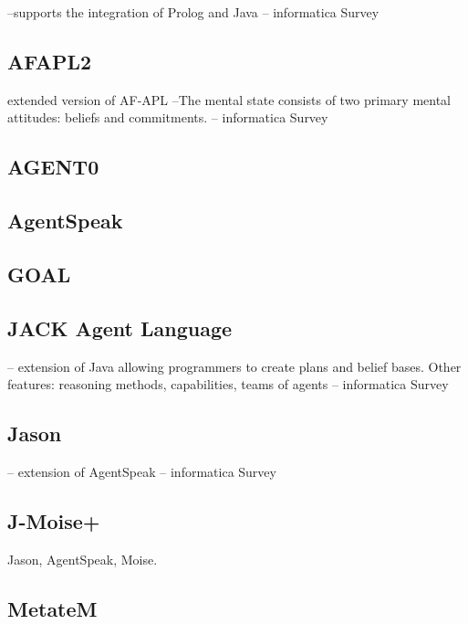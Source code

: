 \documentclass{article}
\begin{document}
--supports the integration of Prolog and Java -- informatica Survey

\subsection{AFAPL2}

extended version of AF-APL \cite{conf/promas/RossCO04}
--The mental state consists of two primary mental attitudes: beliefs and 
commitments. -- informatica Survey

\subsection{AGENT0}

\cite{journals/ai/Shoham93}

\subsection{AgentSpeak}

\cite{conf/maamaw/Rao96}

\subsection{GOAL}

\cite{hindriks2009programmingrationalagents}

\subsection{JACK Agent Language}

\cite{howden2001jack}
-- extension of Java allowing programmers to create plans and belief bases.
Other features: reasoning methods, capabilities, teams of agents -- informatica
Survey 

\subsection{Jason}

\cite{books/sp/map2005/BordiniHV05}
-- extension of AgentSpeak -- informatica Survey

\subsection{J-Moise+}

\cite{journals/ijaose/HubnerSB07}
Jason, AgentSpeak, Moise.

\subsection{MetateM}
\end{document}
